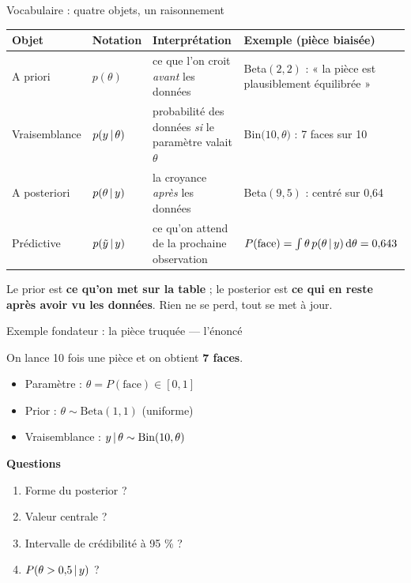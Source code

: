 \begin{frame}{Vocabulaire : quatre objets, un raisonnement}
\begin{center}
{\setlength{\tabcolsep}{3pt}\begin{tabular}{@{}p{2.0cm}p{2.5cm}p{4.2cm}p{4.3cm}@{}}
\toprule
\textbf{Objet} & \textbf{Notation} & \textbf{Interprétation} & \textbf{Exemple (pièce biaisée)} \\
\midrule
A priori & $p(\theta)$ & ce que l'on croit \emph{avant} les données &
Beta$(2,2)$ : « la pièce est plausiblement équilibrée » \\[2mm]
Vraisemblance & $p(y \,\vert\, \theta)$ & probabilité des données \emph{si} le paramètre valait $\theta$ &
Bin$\big(10, \theta\big)$ : 7 faces sur 10 \\[2mm]
A posteriori & $p(\theta \,\vert\, y)$ & la croyance \emph{après} les données &
Beta$(9,5)$ : centré sur 0,64 \\[2mm]
Prédictive & $p(\tilde y \,\vert\, y)$ & ce qu'on attend de la prochaine observation &
$P(\text{face}) = \int \theta\, p(\theta \,\vert\, y)\,\mathrm{d}\theta = 0{,}643$ \\
\bottomrule
\end{tabular}}
\end{center}
\vspace{1mm}
\begin{kbox}[La règle d'or]
Le prior est \textbf{ce qu'on met sur la table} ; le posterior est
\textbf{ce qui en reste après avoir vu les données}. Rien ne se perd, tout se met à jour.
\end{kbox}
\end{frame}

\begin{frame}{Exemple fondateur : la pièce truquée --- l'énoncé}
\begin{ebox}[Énoncé]
On lance 10 fois une pièce et on obtient \textbf{7 faces}.
\begin{itemize}
  \item Paramètre : $\theta = P(\text{face}) \in [0,1]$
  \item Prior : $\theta \sim \mathrm{Beta}(1,1)$ (uniforme)
  \item Vraisemblance : $y \,\vert\, \theta \sim \mathrm{Bin}(10, \theta)$
\end{itemize}
\vspace{1mm}
\textbf{Questions}
\begin{enumerate}
  \item Forme du posterior ?
  \item Valeur centrale ?
  \item Intervalle de crédibilité à 95 \% ?
  \item $P(\theta > 0{,}5 \,\vert\, y)$ ?
\end{enumerate}
\end{ebox}
\end{frame}

